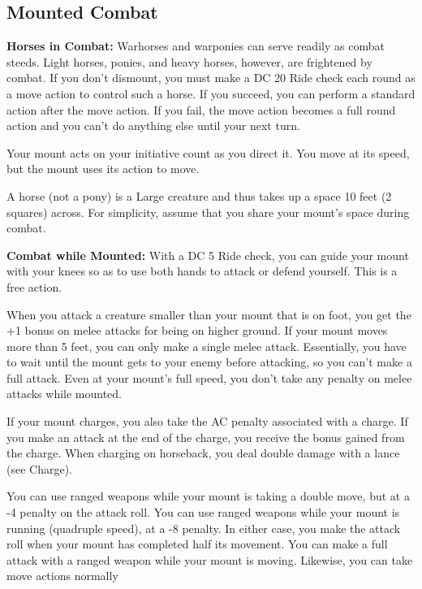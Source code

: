 \subsection{Mounted Combat}

\textbf{Horses in Combat:} Warhorses and warponies can serve readily as combat 
steeds. Light horses, ponies, and heavy horses, however, are frightened by combat. 
If you don't dismount, you must make a DC 20 Ride check each round as a move action 
to control such a horse. If you succeed, you can perform a standard action after 
the move action. If you fail, the move action becomes a full round action and you 
can't do anything else until your next turn.

Your mount acts on your initiative count as you direct it. You move at its speed, 
but the mount uses its action to move.

A horse (not a pony) is a Large creature and thus takes up a space 10 feet (2 squares) 
across. For simplicity, assume that you share your mount's space during combat.

\textbf{Combat while Mounted:} With a DC 5 Ride check, you can guide your mount 
with your knees so as to use both hands to attack or defend yourself. This is a 
free action.

When you attack a creature smaller than your mount that is on foot, you get the 
+1 bonus on melee attacks for being on higher ground. If your mount moves more 
than 5 feet, you can only make a single melee attack. Essentially, you have to 
wait until the mount gets to your enemy before attacking, so you can't make a full 
attack. Even at your mount's full speed, you don't take any penalty on melee attacks 
while mounted.

If your mount charges, you also take the AC penalty associated with a charge. If 
you make an attack at the end of the charge, you receive the bonus gained from 
the charge. When charging on horseback, you deal double damage with a lance (see 
Charge).

You can use ranged weapons while your mount is taking a double move, but at a -4 
penalty on the attack roll. You can use ranged weapons while your mount is running 
(quadruple speed), at a -8 penalty. In either case, you make the attack roll when 
your mount has completed half its movement. You can make a full attack with a ranged 
weapon while your mount is moving. Likewise, you can take move actions normally

